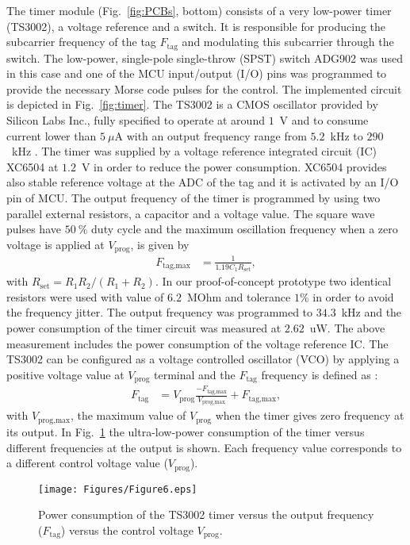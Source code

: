 \documentclass[journal]{IEEEtran}
\begin{document}
The timer module (Fig.~\ref{fig:PCBs}, bottom) consists of a very low-power timer (TS3002), a voltage reference and a switch.
%
It is responsible for producing the subcarrier frequency of the tag  $F_\text{tag}$ and modulating this subcarrier through the  switch. 
%
The low-power,  single-pole single-throw   (SPST) switch ADG902  was used in this case and  one of the MCU input/output (I/O) pins was programmed to provide the necessary  Morse code  pulses  for the control.
%
The implemented circuit is depicted in Fig.~\ref{fig:timer}.
%
The TS3002 is a  CMOS oscillator provided by Silicon Labs Inc., fully 
specified to operate at around $1$~V  and to consume current lower than  $5~\mu$A  with an output frequency range from $5.2$~kHz to $290$~kHz  \cite{TS3002}.
%
The timer  was supplied by  a voltage reference integrated circuit (IC) XC6504 at $1.2$~V   \cite{XC6504}  in order to reduce the power consumption. 
%
XC6504 provides also stable reference voltage at the ADC  of the tag  and it is activated by an I/O pin of MCU.
%
The output frequency of the timer is programmed by using two parallel external resistors, a capacitor and a voltage value. 
%
The square wave pulses  have  $50~\%$ duty
cycle and the   maximum oscillation frequency when a zero voltage is applied at $V_\text{prog}$, is given by
%
\begin{align}
F_\text{tag,max} &=  \frac{1}{1.19  C_{1} R_\text{set}},
\label{eq:fmax}
\end{align}
with  $R_\text{set}= R_\text{1}R_\text{2}/(R_\text{1}+R_\text{2})$.
%
In our proof-of-concept prototype  two  identical resistors were used with value of $6.2$~MOhm and tolerance $1\%$ in order to avoid the frequency jitter.
%
The output frequency was programmed to $34.3$~kHz and the power consumption of the timer circuit was measured at $2.62$~uW.
%
The  above measurement includes the power consumption of the  voltage reference IC.
%
%
%
The TS3002 can be configured as a voltage controlled oscillator (VCO) by applying  a positive voltage value at  $V_\text{prog}$ terminal and the $F_{\text{tag}}$ frequency  is defined as \cite{KonstantopoulosMSc}:
%
\begin{align}
F_\text{tag}&=V_\text{prog} \frac{-F_\text{tag,max} }{V_\text{prog,max}}+F_\text{tag,max},
\label{eq:fmax}
\end{align}
%
with $V_\text{prog,max}$,   the maximum value of  $V_\text{prog}$ when the timer gives zero frequency at its output. 
%
In Fig.~\ref{fig:timer_power} the ultra-low-power consumption of the timer versus different frequencies at the output is shown. 
%
Each frequency value corresponds to a different control voltage value ($V_\text{prog}$).   
%
\begin{figure}[t]
\centering
\texttt{[image: Figures/Figure6.eps]}
\caption{Power consumption of the TS3002 timer versus the output frequency ($F_\text{tag}$) versus the control voltage $V_\text{prog}$.}
\label{fig:timer_power}
\end{figure}
\end{document}
